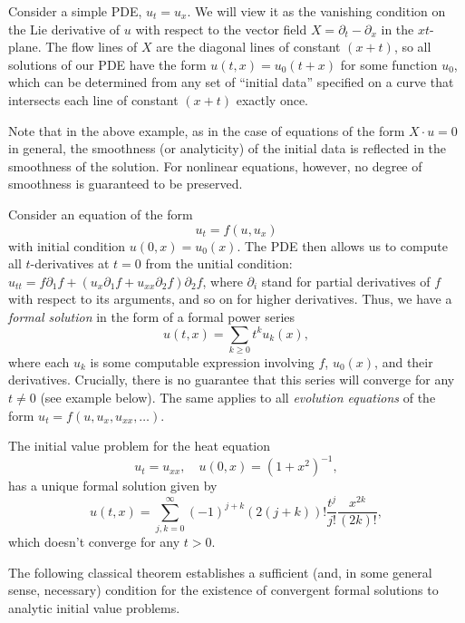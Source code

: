 Consider a simple PDE, $u_t=u_x$. We will view it as the vanishing condition on the Lie derivative of $u$ with respect to the vector field $X=\partial_t-\partial_x$ in the $xt$-plane. The flow lines of $X$ are the diagonal lines of constant $(x+t)$, so all solutions of our PDE have the form $u(t,x)=u_0(t+x)$ for some function $u_0$, which can be determined from any set of ``initial data'' specified on a curve that intersects each line of constant $(x+t)$ exactly once. 

Note that in the above example, as in the case of equations of the form $X\cdot u=0$ in general, the smoothness (or analyticity) of the initial data is reflected in the smoothness of the solution. For nonlinear equations, however, no degree of smoothness is guaranteed to be preserved. 

Consider an equation of the form 
\[u_t=f(u,u_x)\] 
with initial condition $u(0,x)=u_0(x)$. The PDE then allows us to compute all $t$-derivatives at $t=0$ from the unitial condition: $u_{tt}=f\partial_1f+(u_x\partial_1 f+u_{xx}\partial_2f)\partial_2f$, where $\partial_i$ stand for partial derivatives of $f$ with respect to its arguments, and so on for higher derivatives. Thus, we have a \emph{formal solution} in the form of a formal power series 
\[u(t,x)=\sum_{k\geq 0}t^k u_k(x),\]
where each $u_k$ is some computable expression involving $f$, $u_0(x)$, and their derivatives. Crucially, there is no guarantee that this series will converge for any $t\neq 0$ (see example below). The same applies to all \emph{evolution equations} of the form $u_t=f(u,u_x,u_{xx},\ldots)$.

\begin{example}\label{example heat equation}
    The initial value problem for the heat equation 
    \[u_t=u_{xx},\quad u(0,x)=(1+x^2)^{-1},\] 
    has a unique formal solution given by 
    \[u(t,x)=\sum_{j,k=0}^\infty (-1)^{j+k}(2(j+k))!\frac{t^j}{j!}\frac{x^{2k}}{(2k)!},\]
    which doesn't converge for any $t>0$.
\end{example}

The following classical theorem establishes a sufficient (and, in some general sense, necessary) condition for the existence of convergent formal solutions to analytic initial value problems.

